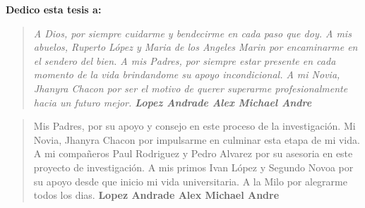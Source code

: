 \newpage
 \pagestyle{plain}
 
 {\bf\Large {Dedico esta tesis a:}}
 \vskip 1cm
\begin{quotation}
{\it A Dios, por siempre cuidarme y bendecirme en cada paso que doy.
\vskip 1cm
A mis abuelos, Ruperto López y Maria de los Angeles Marin por encaminarme en el sendero del bien.
\vskip 1cm
A mis Padres, por siempre estar presente en cada momento de la vida brindandome su apoyo incondicional.
\vskip 1cm
A mi Novia, Jhanyra Chacon por ser el motivo de querer superarme profesionalmente hacia un futuro mejor.
\vskip 1cm
\textbf{Lopez Andrade Alex Michael Andre }}
\end{quotation}
\newpage

\newpage

 {\bf\Large {}}
 \vskip 1.5cm
 {\bf\Large {}}
\begin{quotation}
Mis Padres, por su apoyo y consejo en este proceso de la investigación.
\vskip 1cm
Mi Novia, Jhanyra Chacon por impulsarme en culminar esta etapa de mi vida.
\vskip 1cm
A mi compañeros Paul Rodriguez y Pedro Alvarez por su asesoria en este proyecto de investigación.
\vskip 1cm
A mis primos Ivan López y Segundo Novoa por su apoyo desde que inicio mi vida universitaria.
\vskip 1cm
A la Milo por alegrarme todos los dias.
\vskip 1cm
\textbf{Lopez Andrade Alex Michael Andre }  %
 \end{quotation}
 


%



